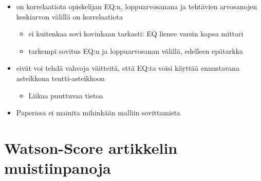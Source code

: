 \begin{itemize}
    \item on korrelaatiota opiskelijan EQ:n, loppuarvosanana ja tehtävien arvosanojen keskiarvon välillä on korrelaatiota
    \begin{itemize}
        \item ei kuitenkaa sovi kovinkaan tarkasti: EQ lienee varsin kapea mittari
        \item tarkempi sovitus EQ:n ja loppuarvosanan välillä, edelleen epätarkka
    \end{itemize}
    \item eivät voi tehdä vahvoja väitteitä, että EQ:ta voisi käyttää ennustavana asteikkona tentti-asteikkoon
    \begin{itemize}
        \item Liikaa puuttuvaa tietoa
    \end{itemize}
    \item Paperissa ei mainita mihinkään malliin sovittamista
\end{itemize}


\section{Watson-Score artikkelin muistiinpanoja\cite{watson2013predicting}}

